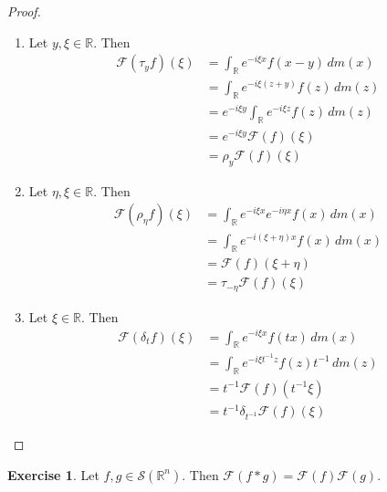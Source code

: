 \documentclass[12pt]{amsart}
\theoremstyle{definition}
\newtheorem{ex}[definition]{Exercise}
\newcommand{\del}{\delta}
\newcommand{\R}{\mathbb{R}}
\newcommand{\MF}{\mathcal{F}}
\newcommand{\MS}{\mathcal{S}}
\newcommand{\dm}{\, d m}
\begin{document}
	\begin{proof}\
		\begin{enumerate}
			\item Let $y, \xi \in \R$. Then 
			\begin{align*}
				\MF(\tau_yf)(\xi) 
				& = \int_{\R} e^{-i\xi x} f(x-y) \dm(x) \\
				& = \int_{\R} e^{-i\xi (z+y)} f(z) \dm(z) \\
				& = e^{-i\xi y} \int_{\R} e^{-i\xi z} f(z) \dm(z) \\
				& = e^{-i\xi y} \MF(f)(\xi) \\
				& = \rho_{y} \MF(f)(\xi)
			\end{align*}
			\item Let $\eta, \xi \in \R$. Then 
			\begin{align*}
				\MF(\rho_{\eta}f)(\xi) 
				& = \int_{\R} e^{-i\xi x} e^{-i\eta x}f(x) \dm(x) \\
				& = \int_{\R} e^{-i(\xi + \eta)x} f(x) \dm(x) \\
				& = \MF(f)(\xi + \eta) \\
				&= \tau_{-\eta}\MF(f)(\xi)
			\end{align*}
			\item Let $\xi \in \R$. Then 
			\begin{align*}
				\MF(\del_t f)(\xi) 
				& = \int_{\R} e^{-i\xi x} f(tx) \dm(x) \\
				& = \int_{\R} e^{-i\xi t^{-1} z} f(z) t^{-1}\dm(z) \\
				& = t^{-1}\MF(f)(t^{-1} \xi) \\
				& = t^{-1} \del_{t^{-1}} \MF(f)(\xi)
			\end{align*}
		\end{enumerate}
	\end{proof}

	\begin{ex}
		Let $f,g \in \MS(\R^n)$. Then $\MF(f*g) = \MF(f)\MF(g)$.
	\end{ex}
\end{document}
